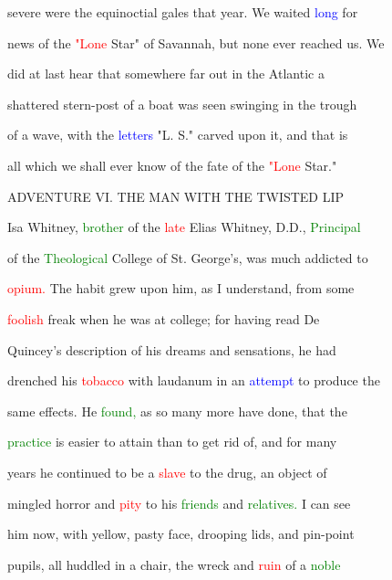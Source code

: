  severe were the equinoctial gales that year. We \textcolor{BurntOrange}{waited} \textcolor{blue}{long} for

 news of the \textcolor{red}{"Lone} \textcolor{BurntOrange}{Star"} of Savannah, but none ever reached us. We

 did at last hear that somewhere far out in the Atlantic a

 \textcolor{BurntOrange}{shattered} stern-post of a boat was seen swinging in the trough

 of a wave, with the \textcolor{blue}{letters} "L. S." carved upon it, and that is

 all which we shall ever know of the \textcolor{BurntOrange}{fate} of the \textcolor{red}{"Lone} \textcolor{BurntOrange}{Star."}







 \textcolor{BurntOrange}{ADVENTURE} VI. THE MAN WITH THE TWISTED LIP



 Isa Whitney, \textcolor{green}{brother} of the \textcolor{red}{late} Elias Whitney, D.D., \textcolor{green}{Principal}

 of the \textcolor{green}{Theological} College of St. George's, was much addicted to

 \textcolor{red}{opium.} The habit \textcolor{BurntOrange}{grew} upon him, as I understand, from some

 \textcolor{red}{foolish} freak when he was at college; for having read De

 Quincey's description of his dreams and sensations, he had

 drenched his \textcolor{red}{tobacco} with laudanum in an \textcolor{blue}{attempt} to produce the

 same effects. He \textcolor{green}{found,} as so many more have done, that the

 \textcolor{green}{practice} is easier to attain than to get rid of, and for many

 years he continued to be a \textcolor{red}{slave} to the drug, an object of

 mingled \textcolor{BurntOrange}{horror} and \textcolor{red}{pity} to his \textcolor{green}{friends} and \textcolor{green}{relatives.} I can see

 him now, with yellow, pasty face, drooping lids, and pin-point

 pupils, all huddled in a chair, the \textcolor{BurntOrange}{wreck} and \textcolor{red}{ruin} of a \textcolor{green}{noble}

